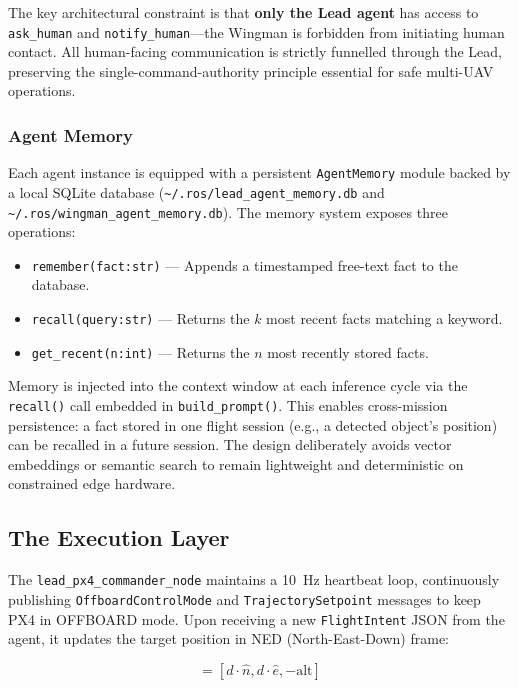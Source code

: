 \documentclass[conference]{IEEEtran}
\begin{document}
The key architectural constraint is that \textbf{only the Lead agent} has access to \texttt{ask\_human} and \texttt{notify\_human}—the Wingman is forbidden from initiating human contact. All human-facing communication is strictly funnelled through the Lead, preserving the single-command-authority principle essential for safe multi-UAV operations.

\subsubsection{Agent Memory}

Each agent instance is equipped with a persistent \texttt{AgentMemory} module backed by a local SQLite database (\texttt{\textasciitilde/.ros/lead\_agent\_memory.db} and \texttt{\textasciitilde/.ros/wingman\_agent\_memory.db}). The memory system exposes three operations:

\begin{itemize}
    \item \texttt{remember(fact:str)} — Appends a timestamped free-text fact to the database.
    \item \texttt{recall(query:str)} — Returns the $k$ most recent facts matching a keyword.
    \item \texttt{get\_recent(n:int)} — Returns the $n$ most recently stored facts.
\end{itemize}

Memory is injected into the context window at each inference cycle via the \texttt{recall()} call embedded in \texttt{build\_prompt()}. This enables cross-mission persistence: a fact stored in one flight session (e.g., a detected object's position) can be recalled in a future session. The design deliberately avoids vector embeddings or semantic search to remain lightweight and deterministic on constrained edge hardware.

\subsection{The Execution Layer}

The \texttt{lead\_px4\_commander\_node} maintains a 10~Hz heartbeat loop, continuously publishing \texttt{OffboardControlMode} and \texttt{TrajectorySetpoint} messages to keep PX4 in OFFBOARD mode. Upon receiving a new \texttt{FlightIntent} JSON from the agent, it updates the target position in NED (North-East-Down) frame:

\begin{equation}
[x_{NED}, y_{NED}, z_{NED}] = [d \cdot \hat{n}, d \cdot \hat{e}, -\text{alt}]
\label{eq:ned}
\end{equation}
\end{document}

